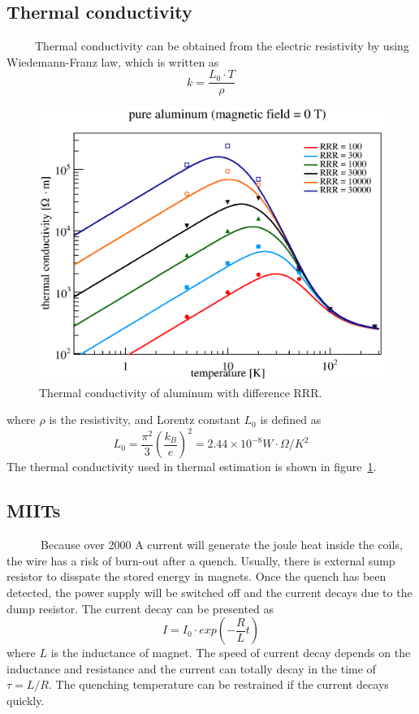 \subsection{Thermal conductivity}
~~~~~Thermal conductivity can be obtained from the electric resistivity by using Wiedemann-Franz law, which is written as
\begin{equation}
 k = \frac{L_0 \cdot T}{\rho}
\end{equation}
\begin{figure}[H]
 \centering
 \includegraphics[scale=0.43]{chapter5/fig/thermalcon.eps}
 \caption{Thermal conductivity of aluminum with difference RRR.}
 \label{therm}
\end{figure}
where $\rho$ is the resistivity, and Lorentz constant $L_0$ is defined as
\begin{equation}
 L_0 = \frac{\pi^2}{3}(\frac{k_B}{e})^2 = 2.44\times 10^{-8} W\cdot\Omega /K^2
\end{equation}
The thermal conductivity used in thermal estimation is shown in figure~\ref{therm}.

  \subsection{MIITs}
~~~~~~Because over 2000 A current will generate the joule heat inside the coils, the wire has a risk of burn-out after a quench.
Usually, there is external sump resistor to disspate the stored energy in magnets.
Once the quench has been detected, the power supply will be switched off and the current decays due to the dump resistor.
The current decay can be presented as
\begin{equation}
 I = I_0 \cdot exp(-\frac{R}{L} t)
\end{equation}
where $L$ is the inductance of magnet.
The speed of current decay depends on the inductance and resistance and the current can totally decay in the time of $\tau = L/R$.
The quenching temperature can be restrained if the current decays quickly.

